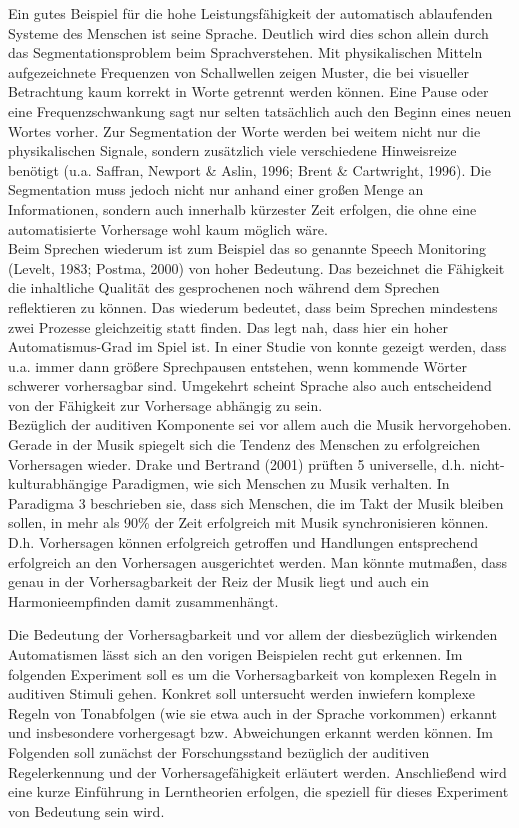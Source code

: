 \documentclass[doc,a4paper,12pt]{apa6}
\begin{document}
Ein gutes Beispiel für die hohe Leistungsfähigkeit der automatisch ablaufenden Systeme des Menschen ist seine Sprache. Deutlich wird dies schon allein durch das Segmentationsproblem beim Sprachverstehen. Mit physikalischen Mitteln aufgezeichnete Frequenzen von Schallwellen zeigen Muster, die bei visueller Betrachtung kaum korrekt in Worte getrennt werden können. Eine Pause oder eine Frequenzschwankung sagt nur selten tatsächlich auch den Beginn eines neuen Wortes vorher. Zur Segmentation der Worte werden bei weitem nicht nur die physikalischen Signale, sondern zusätzlich viele verschiedene Hinweisreize benötigt (u.a. Saffran, Newport \& Aslin, 1996; Brent \& Cartwright, 1996). Die Segmentation muss jedoch nicht nur anhand einer großen Menge an Informationen, sondern auch innerhalb kürzester Zeit erfolgen, die ohne eine automatisierte Vorhersage wohl kaum möglich wäre.\\
Beim Sprechen wiederum ist zum Beispiel das so genannte Speech Monitoring (Levelt, 1983; Postma, 2000) von hoher Bedeutung. Das bezeichnet die Fähigkeit die inhaltliche Qualität des gesprochenen noch während dem Sprechen reflektieren zu können. Das wiederum bedeutet, dass beim Sprechen mindestens zwei Prozesse gleichzeitig statt finden. Das legt nah, dass hier ein hoher Automatismus-Grad im Spiel ist. In einer Studie von \textcite{goldman1958speech} \parencite{goldman1958speech} konnte gezeigt werden, dass u.a. immer dann größere Sprechpausen entstehen, wenn kommende Wörter schwerer vorhersagbar sind. Umgekehrt scheint Sprache also auch entscheidend von der Fähigkeit zur Vorhersage abhängig zu sein.\\
Bezüglich der auditiven Komponente sei vor allem auch die Musik hervorgehoben. Gerade in der Musik spiegelt sich die Tendenz des Menschen zu erfolgreichen Vorhersagen wieder. Drake und Bertrand (2001) prüften 5 universelle, d.h. nicht-kulturabhängige Paradigmen, wie sich Menschen zu Musik verhalten. In Paradigma 3 beschrieben sie, dass sich Menschen, die im Takt der Musik bleiben sollen, in mehr als 90\% der Zeit erfolgreich mit Musik synchronisieren können. D.h. Vorhersagen können erfolgreich getroffen und Handlungen entsprechend erfolgreich an den Vorhersagen ausgerichtet werden. Man könnte mutmaßen, dass genau in der Vorhersagbarkeit der Reiz der Musik liegt und auch ein Harmonieempfinden damit zusammenhängt.

Die Bedeutung der Vorhersagbarkeit und vor allem der diesbezüglich wirkenden Automatismen lässt sich an den vorigen Beispielen recht gut erkennen. Im folgenden Experiment soll es um die Vorhersagbarkeit von komplexen Regeln in auditiven Stimuli gehen. Konkret soll untersucht werden inwiefern komplexe Regeln von Tonabfolgen (wie sie etwa auch in der Sprache vorkommen) erkannt und insbesondere vorhergesagt bzw. Abweichungen erkannt werden können. Im Folgenden soll zunächst der Forschungsstand bezüglich der auditiven Regelerkennung und der Vorhersagefähigkeit erläutert werden. Anschließend wird eine kurze Einführung in Lerntheorien erfolgen, die speziell für dieses Experiment von Bedeutung sein wird.
\end{document}
